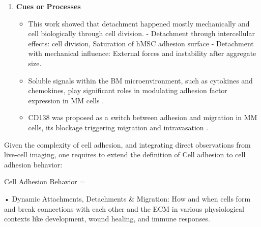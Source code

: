 \begin{enumerate}
      \item \textbf{Cues or Processes}
            \begin{itemize}
                  \item This work showed that detachment happened mostly
                        mechanically and cell biologically through cell
                        division. - Detachment through intercellular effects:
                        cell division, Saturation of hMSC adhesion surface -
                        Detachment with mechanical influence: External forces
                        and instability after aggregate size.
                  \item Soluble signals within the BM microenvironment, such as
                        cytokines and chemokines, play significant roles in modulating
                        adhesion factor expression in MM cells
                        \cite{aggarwalChemokinesMultipleMyeloma2006, alsayedMechanismsRegulationCXCR42007}.
                  \item CD138 was proposed as a switch between adhesion and
                        migration in MM cells, its blockage triggering migration
                        and intravasation
                        \cite{akhmetzyanovaDynamicCD138Surface2020}.
            \end{itemize}
\end{enumerate}








\label{sec:discussion_dynamic_regulation}%



Given the complexity of cell adhesion, and integrating direct observations from
live-cell imaging, one requires to extend the definition of Cell adhesion
to cell adhesion behavior:

Cell Adhesion Behavior =

• Dynamic Attachments, Detachments \& Migration: How and when cells form and
break connections with each other and the ECM in various physiological contexts
like development, wound healing, and immune responses.

